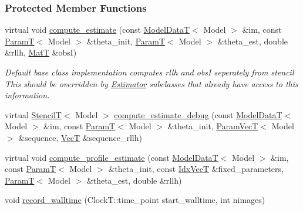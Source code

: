 \subsubsection*{Protected Member Functions}
\begin{DoxyCompactItemize}
\item 
virtual void \hyperlink{classmappel_1_1Estimator_aa46d86cfb5c336c9cb8c106da036d7d1}{compute\+\_\+estimate} (const \hyperlink{namespacemappel_a97f050df953605381ae9c901c3b125f1}{Model\+DataT}$<$ Model $>$ \&im, const \hyperlink{namespacemappel_a667925cb0d6c0e49f2f035cc5a9a6857}{ParamT}$<$ Model $>$ \&theta\+\_\+init, \hyperlink{namespacemappel_a667925cb0d6c0e49f2f035cc5a9a6857}{ParamT}$<$ Model $>$ \&theta\+\_\+est, double \&rllh, \hyperlink{namespacemappel_a7091ab87c528041f7e2027195fad8915}{MatT} \&obsI)
\begin{DoxyCompactList}\small\item\em Default base class implementation computes rllh and obsI seperately from stencil This should be overridden by \hyperlink{classmappel_1_1Estimator}{Estimator} subclasses that already have access to this information. \end{DoxyCompactList}\item 
virtual \hyperlink{namespacemappel_a3a06598240007876f8c4bf834ad86197}{StencilT}$<$ Model $>$ \hyperlink{classmappel_1_1Estimator_a29c41d423941e8b86add3e493cb1375e}{compute\+\_\+estimate\+\_\+debug} (const \hyperlink{namespacemappel_a97f050df953605381ae9c901c3b125f1}{Model\+DataT}$<$ Model $>$ \&im, const \hyperlink{namespacemappel_a667925cb0d6c0e49f2f035cc5a9a6857}{ParamT}$<$ Model $>$ \&theta\+\_\+init, \hyperlink{namespacemappel_a0f86d3153e4e27b095012f140eea58de}{Param\+VecT}$<$ Model $>$ \&sequence, \hyperlink{namespacemappel_a2225ad69f358daa3f4f99282a35b9a3a}{VecT} \&sequence\+\_\+rllh)
\item 
virtual void \hyperlink{classmappel_1_1Estimator_a273f65624e06688cd4b1126e3e7556ae}{compute\+\_\+profile\+\_\+estimate} (const \hyperlink{namespacemappel_a97f050df953605381ae9c901c3b125f1}{Model\+DataT}$<$ Model $>$ \&im, const \hyperlink{namespacemappel_a667925cb0d6c0e49f2f035cc5a9a6857}{ParamT}$<$ Model $>$ \&theta\+\_\+init, const \hyperlink{namespacemappel_ac63743dcd42180127307cd0e4ecdd784}{Idx\+VecT} \&fixed\+\_\+parameters, \hyperlink{namespacemappel_a667925cb0d6c0e49f2f035cc5a9a6857}{ParamT}$<$ Model $>$ \&theta\+\_\+est, double \&rllh)
\item 
void \hyperlink{classmappel_1_1Estimator_a50125572d3b87ebcf1ffb27a8d8c643d}{record\+\_\+walltime} (Clock\+T\+::time\+\_\+point start\+\_\+walltime, int nimages)
\end{DoxyCompactItemize}
